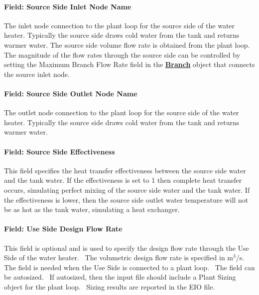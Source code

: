 \paragraph{Field: Source Side Inlet Node Name}\label{field-source-side-inlet-node-name-000}

The inlet node connection to the plant loop for the source side of the water heater. Typically the source side draws cold water from the tank and returns warmer water.
The source side volume flow rate is obtained from the plant loop.
The magnitude of the flow rates through the source side can be controlled by setting the Maximum Branch Flow Rate field in the \textbf{\hyperref[branch]{Branch}} object that connects the source inlet node.

\paragraph{Field: Source Side Outlet Node Name}\label{field-source-side-outlet-node-name-000}

The outlet node connection to the plant loop for the source side of the water heater. Typically the source side draws cold water from the tank and returns warmer water.

\paragraph{Field: Source Side Effectiveness}\label{field-source-side-effectiveness}

This field specifies the heat transfer effectiveness between the source side water and the tank water. If the effectiveness is set to 1 then complete heat transfer occurs, simulating perfect mixing of the source side water and the tank water. If the effectiveness is lower, then the source side outlet water temperature will not be as hot as the tank water, simulating a heat exchanger.

\paragraph{Field: Use Side Design Flow Rate}\label{field-use-side-design-flow-rate-000}

This field is optional and is used to specify the design flow rate through the Use Side of the water heater.~ The volumetric design flow rate is specified in m\(^{3}\)/s.~ The field is needed when the Use Side is connected to a plant loop.~ The field can be autosized.~ If autosized, then the input file should include a Plant Sizing object for the plant loop.~ Sizing results are reported in the EIO file.

